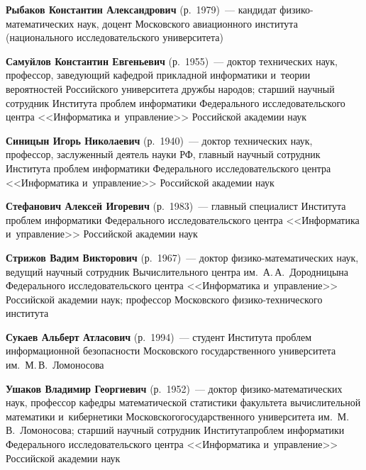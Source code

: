 \begin{multicols}{2}
\noindent
\textbf{Рыбаков Константин Александрович} (р.\ 1979)~---
 кандидат фи\-зи\-ко-ма\-те\-ма\-ти\-че\-ских наук, доцент Мос\-ков\-ского 
авиационного института (национального исследовательского университета)


\vspace*{6pt}

\noindent
\textbf{Самуйлов Константин Евгеньевич} (р.\ 1955)~--- 
доктор технических наук, профессор, за\-ве\-ду\-ющий кафед\-рой прикладной информатики 
и~тео\-рии вероятностей Российского университета дружбы народов;\linebreak 
старший научный со\-труд\-ник Института проб\-лем информатики Федерального 
исследовательского центра <<Информатика и~управ\-ле\-ние>> Российской академии наук


\vspace*{6pt}

\noindent
\textbf{Синицын Игорь Николаевич} (р.\ 1940)~--- 
доктор технических наук, профессор, заслуженный деятель науки РФ, 
главный научный со\-труд\-ник Института проб\-лем информатики Федерального 
исследовательского центра <<Информатика и~управ\-ле\-ние>> Российской академии наук


\vspace*{6pt}

\noindent
\textbf{Стефанович Алексей Игоревич} (р.\ 1983)~---
главный специалист 
Института проб\-лем информатики Федерального исследовательского центра 
<<Информатика и~управ\-ле\-ние>> Российской академии наук


\vspace*{6pt}

\noindent
\textbf{Стрижов Вадим Викторович} (р.\ 1967)~--- 
доктор фи\-зи\-ко-ма\-те\-ма\-ти\-че\-ских наук, 
ведущий научный сотрудник Вычислительного центра им.\ 
А.\,А.~Дородницына Федерального исследовательского центра <<Информатика и~управ\-ле\-ние>> 
Российской академии наук; профессор Московского фи\-зи\-ко-тех\-ни\-че\-ско\-го института




\vspace*{6pt}

\noindent
\textbf{Сукаев Альберт Атласович} (р.\ 1994)~--- 
студент Института проб\-лем информационной 
безопасности Московского государственного университета им.\ М.\,В.~Ломоносова

\vspace*{6pt}
 
\noindent
\textbf{Ушаков Владимир Георгиевич} (р.\ 1952)~--- доктор фи\-зи\-ко-ма\-те\-ма\-ти\-че\-ских
наук, профессор кафедры математической статистики факультета вычислительной
математики и~кибернетики Московского\linebreak государственного университета
им.\ М.\,В.~Ломоносова; старший научный со\-труд\-ник 
Института\linebreak проб\-лем информатики Федерального исследовательского центра 
<<Информатика и~управ\-ле\-ние>> Российской академии наук




\end{multicols}
